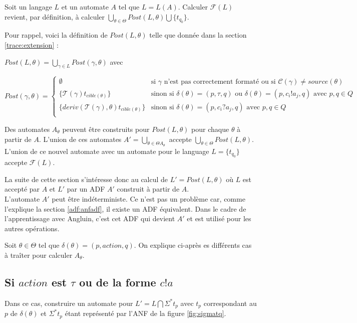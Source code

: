 Soit un langage $L$ et un automate $A$ tel que $L=L(A)$. Calculer $\mathcal{F}(L)$ revient, par définition, à calculer $\bigcup_{\theta\in\Theta}Post(L,\theta)\bigcup \{t_{q_0}\}$.

Pour rappel, voici la définition de $Post(L, \theta)$ telle que donnée dans la section \ref{trace:extension} :

$Post(L,\theta)=\bigcup_{\gamma\in L} Post(\gamma,\theta)$ avec

$$
Post(\gamma,\theta) = \left\{ \begin{array}{ll}
    \emptyset & \text{si } \gamma \text{ n'est pas correctement formaté ou si } \mathcal{C}(\gamma)\neq source(\theta)\\
    \{\mathcal{T}(\gamma)t_{cible(\theta)}\} & \text{sinon si }\delta(\theta)=(p,\tau,q) \text{ ou } \delta(\theta)=(p,c_i!a_j,q) \text{ avec }p,q\in Q\\
    \{deriv(\mathcal{T}(\gamma),\theta)t_{cible(\theta)}\}& \text{sinon si } \delta(\theta)=(p,c_i?a_j,q) \text{ avec }p,q\in Q \\
    \end{array} \right.
$$

Des automates $A_\theta$ peuvent être construits pour $Post(L,\theta)$ pour chaque $\theta$ à partir de $A$. L'union de ces automates $A'=\bigcup_{\theta \in \Theta A_\theta}$ accepte $\bigcup_{\theta\in\Theta}Post(L,\theta)$. L'union de ce nouvel automate avec un automate pour le language $L=\{t_{q_0}\}$ accepte $\mathcal{F}(L)$.

La suite de cette section s'intéresse donc au calcul de $L'= Post(L,\theta)$ où $L$ est accepté par $A$ et $L'$ par un ADF $A'$ construit à partir de $A$.\\

L'automate $A'$ peut être indéterministe. Ce n'est pas un problème car, comme l'explique la section \ref{adf:anfadf}, il existe un ADF équivalent. Dans le cadre de l'apprentissage avec Angluin, c'est cet ADF qui devient $A'$ et est utilisé pour les autres opérations.


Soit $\theta\in\Theta$ tel que $\delta(\theta)=(p,action,q)$. On explique ci-après es différents cas à traîter pour calculer $A_\theta$.

\subsection{Si $action$ est $\tau$ ou de la forme $c!a$}

Dans ce cas, construire un automate pour $L'=L\bigcap\Sigma^*t_p$ avec $t_p$ correspondant au $p$ de $\delta(\theta)$ et $\Sigma^*t_p$ étant représenté par l'ANF de la figure \ref{fig:sigmatq}.

